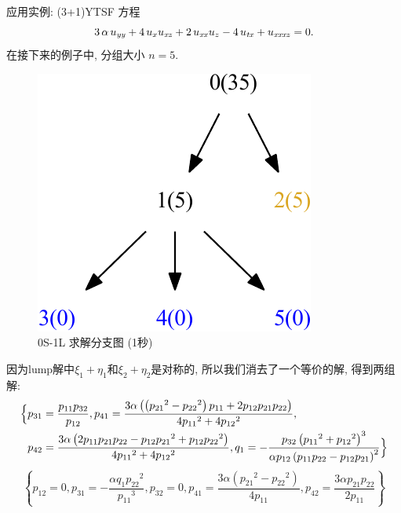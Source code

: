 \begin{frame}{应用实例: (3+1)YTSF 方程}
\[
    3\,\alpha\,u_{{{\it yy}}}+4\,u_{{x}}u_{{{\it xz}}}+2\,u_{{{\it xx}}}u_{{z}}-4\,u_{{{\it tx}}}+u_{{{\it xxxz}}}=0. 
\]
在接下来的例子中, 分组大小 $n=5$. 

\end{frame}
\begin{frame}
\begin{figure}
\centering
\includegraphics[width=.5\textwidth]{../paper/fig/0S1L.pdf}
\caption{0S-1L 求解分支图 (1秒)}
\end{figure}
\end{frame}

\begin{frame}
因为lump解中$\xi_1+\eta_1$和$\xi_2+\eta_2$是对称的, 所以我们消去了一个等价的解, 得到两组解:
\small 
\[
\begin{aligned}
\Bigl\{ 
& p_{{31}}={\frac {p_{{11}}p_{{32}}}{p_{{12}}}}, 
p_{{41}}={\frac {3\alpha \left(  \left( {p_{{21}}}^{2}-{p_{{22}}}^{2} \right) p_{{11}}+2p_{{12}}p_{{21}}p_{{22}} \right) }{4{p_{{11}}}^{2}+4{p_{{12}}}^{2}}}, \\
& p_{{42}}={\frac {3\alpha \left( 2p_{{11}}p_{{21}}p_{{22}}-p_{{12}}{p_{{21}}}^{2}+p_{{12}}{p_{{22}}}^{2}\right) }{4{p_{{11}}}^{2}+4{p_{{12}}}^{2}}}, 
q_{{1}}=-{\frac {p_{{32}} \left( {p_{{11}}}^{2}+{p_{{12}}}^{2} \right) ^{3}}{\alpha p_{{12}} \left( p_{{11}}p_{{22}}-p_{{12}}p_{{21}} \right) ^{2}}} 
 \Bigr\} 
\end{aligned}
\]
\[
 \left\{ p_{{12}}=0,p_{{31}}=-{\frac {\alpha q_{{1}}{p_{{22}}}^{2}
}{{p_{{11}}}^{3}}},p_{{32}}=0,p_{{41}}={\frac {3\alpha
 \left( {p_{{21}}}^{2}-{p_{{22}}}^{2} \right) }{4p_{{11}}}},p_{{42}
}={\frac {3\alpha p_{{21}}p_{{22}}}{2p_{{11}}}} \right\}
\]
    
\end{frame}


